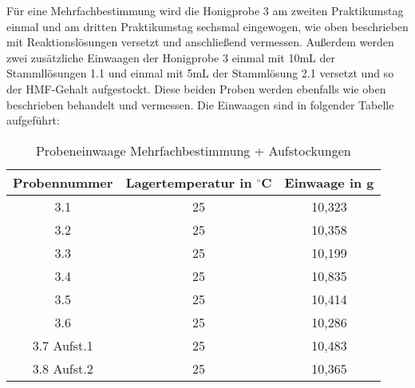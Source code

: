 Für eine Mehrfachbestimmung wird die Honigprobe 3 am zweiten Praktikumstag einmal und am dritten Praktikumstag sechsmal eingewogen, wie oben beschrieben mit Reaktionslösungen versetzt und anschließend vermessen. Außerdem werden zwei zusätzliche Einwaagen der Honigprobe 3 einmal mit 10mL der Stammllösungen 1.1 und einmal mit 5mL der Stammlösung 2.1 versetzt und so der HMF-Gehalt aufgestockt. Diese beiden Proben werden ebenfalls wie oben beschrieben behandelt und vermessen. Die Einwaagen sind in folgender Tabelle aufgeführt:
\begin{table}[htbp]
	\centering
	\caption{Probeneinwaage Mehrfachbestimmung + Aufstockungen}
		\begin{tabular}{c|c|c} 
			Probennummer & Lagertemperatur in $^\circ$C & Einwaage in g\\
			\hline
			3.1 & 25 & 10,323\\
			\hline
			3.2 & 25 & 10,358\\
			\hline
			3.3 & 25 & 10,199\\
			\hline
			3.4 & 25 & 10,835\\
			\hline
			3.5 & 25 & 10,414\\
			\hline
			3.6 & 25 & 10,286\\
			\hline
			3.7 Aufst.1 & 25 & 10,483\\
			\hline
			3.8 Aufst.2 & 25 & 10,365\\
		\end{tabular}
	\label{tab:Probeneinwaage Mehrfachbestimmung + Aufstockungen}
\end{table}
